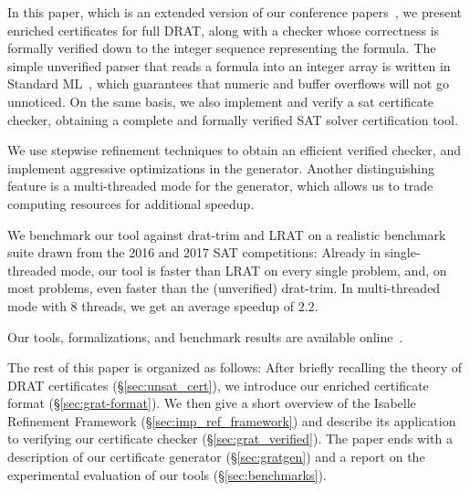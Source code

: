 \documentclass[smallcondensed]{svjour3}     %
\begin{document}
% 
% 

In this paper, which is an extended version of our conference papers~\cite{La17_CADE,La17_SAT}, we present enriched certificates for full DRAT, along with a checker whose correctness is formally verified down to the integer sequence 
representing the formula. 
The simple unverified parser that reads a formula into an integer array is written in Standard ML~\cite{MHMT97}, which guarantees that numeric and buffer overflows will 
not go unnoticed. On the same basis, we also implement and verify a sat certificate checker, obtaining a complete and formally verified SAT solver certification tool.

We use stepwise refinement techniques to obtain an efficient verified checker, and implement aggressive optimizations in the generator.
Another distinguishing feature is a multi-threaded mode for the generator, which allows us to trade computing resources for additional speedup.

We benchmark our tool against drat-trim and LRAT on a realistic benchmark suite drawn from the 2016 and 2017 SAT 
competitions: Already in single-threaded mode, our tool is faster than LRAT on every single problem, and, on most problems, even faster than the (unverified) drat-trim.
In multi-threaded mode with 8 threads, we get an average speedup of $2.2$.

Our tools, formalizations, and benchmark results are available online~\cite{GRAT-homepage}.

The rest of this paper is organized as follows: 
After briefly recalling the theory of DRAT certificates (\S\ref{sec:unsat_cert}), we introduce our enriched certificate format (\S\ref{sec:grat-format}).
We then give a short overview of the Isabelle Refinement Framework (\S\ref{sec:imp_ref_framework})
and describe its application to verifying our certificate checker (\S\ref{sec:grat_verified}). 
The paper ends with a description of our certificate generator (\S\ref{sec:gratgen}) and a report on the experimental evaluation 
of our tools (\S\ref{sec:benchmarks}).
\end{document}

